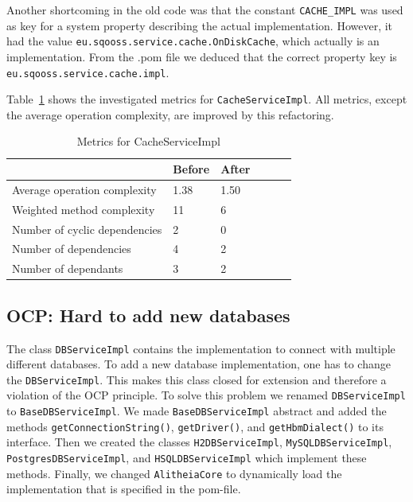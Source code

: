 \documentclass{article}
\begin{document}
Another shortcoming in the old code was that the constant \verb|CACHE_IMPL| was used as key for a system property describing the actual implementation. However, it had the value \texttt{eu\allowbreak.sqooss.service.cache.OnDiskCache}, which actually is an implementation. From the .pom file we deduced that the correct property key is \verb|eu.sqooss.service.cache.impl|.

Table~\ref{tbl:cacheserviceimpl} shows the investigated metrics for \verb|CacheServiceImpl|. All metrics, except the average operation complexity, are improved by this refactoring.

\begin{table}[h]
	\centering
    \begin{tabular}{l|llll}
    ~                                 & Before & After & ~ & ~ \\ \hline
    Average operation complexity      & 1.38 & 1.50 \\
    Weighted method complexity        & 11   & 6 \\
    Number of cyclic dependencies     & 2    & 0 \\
    Number of dependencies            & 4    & 2 \\
    Number of dependants              & 3    & 2 \\
    \end{tabular}
    \caption{Metrics for CacheServiceImpl}
    \label{tbl:cacheserviceimpl}
\end{table}

\subsection{OCP: Hard to add new databases}
The class \verb|DBServiceImpl| contains the implementation to connect with multiple different databases. To add a new database implementation, one has to change the \verb|DBServiceImpl|. This makes this class closed for extension and therefore a violation of the OCP principle.
To solve this problem we renamed \verb|DBServiceImpl| to \verb|BaseDBServiceImpl|. We made \verb|BaseDBServiceImpl| abstract and added the methods \verb|getConnectionString()|, \verb|getDriver()|, and \verb|getHbmDialect()| to its interface. Then we created the classes \verb|H2DBServiceImpl|, \verb|MySQLDBServiceImpl|, \verb|PostgresDBServiceImpl|, and \verb|HSQLDBServiceImpl| which implement these methods. Finally, we changed \verb|AlitheiaCore| to dynamically load the implementation that is specified in the pom-file.
\end{document}
